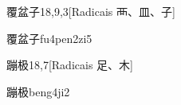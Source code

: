 \begin{entry}{覆盆子}{18,9,3}[Radicais ⾑、⽫、⼦]
  \begin{phonetics}{覆盆子}{fu4pen2zi5}
  \end{phonetics}
\end{entry}

\begin{entry}{蹦极}{18,7}[Radicais ⾜、⽊]
  \begin{phonetics}{蹦极}{beng4ji2}
  \end{phonetics}
\end{entry}


